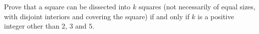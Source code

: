 Prove that a square can be dissected into $k$ squares (not necessarily of equal sizes, with disjoint interiors and covering the square) if and only if $k$ is a positive integer other than $2$, $3$ and $5$.
